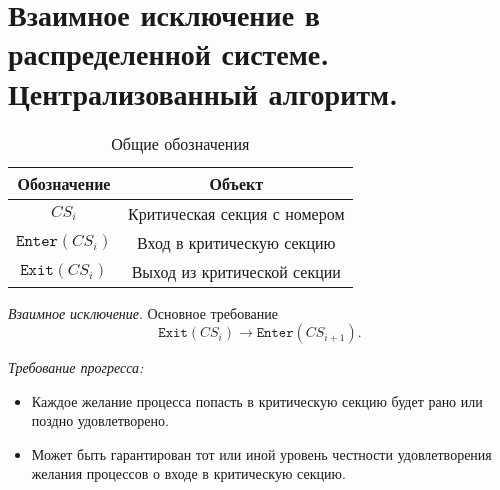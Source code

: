 \section{Взаимное исключение в распределенной системе. Централизованный алгоритм.}

\begin{table}[!ht]
    \centering
    \begin{tabular}{|c|c|} \hline
        Обозначение & Объект \\ \hline
        $CS_i$ & Критическая секция с номером \\ \hline
        $\texttt{Enter}(CS_i)$ & Вход в критическую секцию \\ \hline
        $\texttt{Exit}(CS_i)$ & Выход из критической секции \\ \hline
    \end{tabular}
    \caption{Общие обозначения}
\end{table}

\begin{definition}
    \textit{Взаимное исключение}. Основное требование
    \[
        \texttt{Exit}(CS_i) \to \texttt{Enter}(CS_{i+1})
    .\]
\end{definition}

\begin{definition}
    \textit{Требование прогресса:}
    \begin{itemize}
        \item Каждое желание процесса попасть в критическую секцию будет 
            рано или поздно удовлетворено.
        \item Может быть гарантирован тот или иной уровень честности удовлетворения 
            желания процессов о входе в критическую секцию.
    \end{itemize}
\end{definition}

